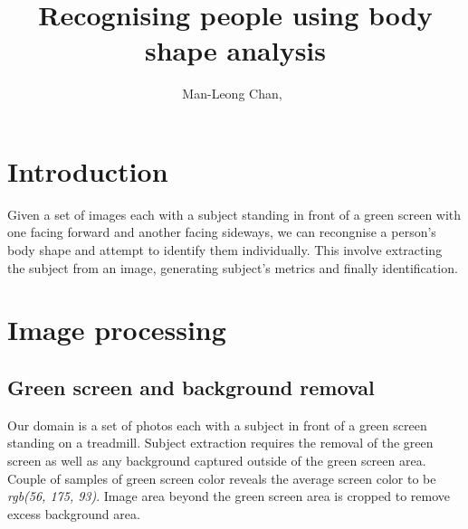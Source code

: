 \documentclass[10pt,journal,compsoc]{IEEEtran}
\begin{document}
\title{Recognising people using body shape analysis}

\author{Man-Leong Chan,~}



\maketitle
\IEEEdisplaynontitleabstractindextext
\IEEEpeerreviewmaketitle



\section{Introduction}

Given a set of images each with a subject standing in front of a green screen with one facing forward and another facing sideways, we can recongnise a person's body shape and attempt to identify them individually. This involve extracting the subject from an image, generating subject's metrics and finally identification.  




\section{Image processing}

\subsection{Green screen and background removal}
Our domain is a set of photos each with a subject in front of a green screen standing on a treadmill. Subject extraction requires the removal of the green screen as well as any background captured outside of the green screen area. Couple of samples of green screen color reveals the average screen color to be \textit{rgb(56, 175, 93)}. Image area beyond the green screen area is cropped to remove excess background area. 
\end{document}

